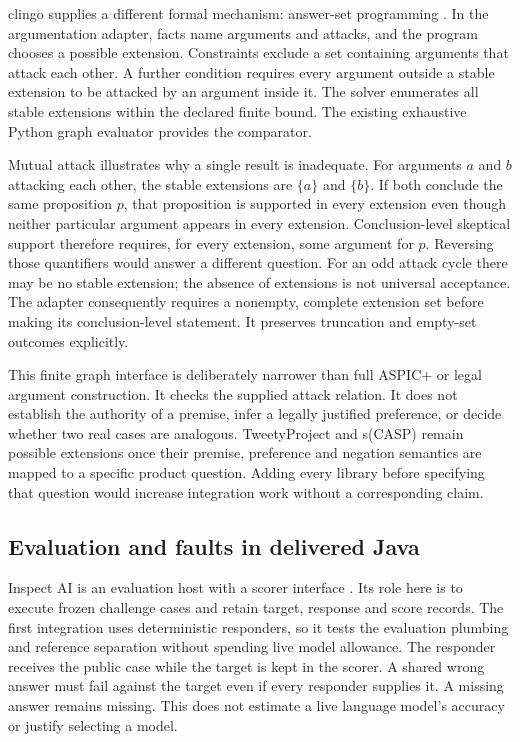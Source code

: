\documentclass[12pt,a4paper,oneside,openany]{book}
\begin{document}
clingo supplies a different formal mechanism: answer-set programming
\citep{clingosoftware}. In the argumentation adapter, facts name arguments and
attacks, and the program chooses a possible extension. Constraints exclude a set
containing arguments that attack each other. A further condition requires every
argument outside a stable extension to be attacked by an argument inside it.
The solver enumerates all stable extensions within the declared finite bound.
The existing exhaustive Python graph evaluator provides the comparator.

Mutual attack illustrates why a single result is inadequate. For arguments $a$
and $b$ attacking each other, the stable extensions are $\{a\}$ and $\{b\}$.
If both conclude the same proposition $p$, that proposition is supported in every
extension even though neither particular argument appears in every extension.
Conclusion-level skeptical support therefore requires, for every extension,
some argument for $p$. Reversing those quantifiers would answer a different
question. For an odd attack cycle there may be no stable extension; the absence
of extensions is not universal acceptance. The adapter consequently requires a
nonempty, complete extension set before making its conclusion-level statement.
It preserves truncation and empty-set outcomes explicitly.

This finite graph interface is deliberately narrower than full ASPIC+ or legal
argument construction. It checks the supplied attack relation. It does not
establish the authority of a premise, infer a legally justified preference, or
decide whether two real cases are analogous. TweetyProject and s(CASP) remain
possible extensions once their premise, preference and negation semantics are
mapped to a specific product question. Adding every library before specifying
that question would increase integration work without a corresponding claim.

\subsection{Evaluation and faults in delivered Java}

Inspect AI is an evaluation host with a scorer interface
\citep{inspectsoftware}. Its role here is to execute frozen challenge cases and
retain target, response and score records. The first integration uses deterministic
responders, so it tests the evaluation plumbing and reference separation without
spending live model allowance. The responder receives the public case while the
target is kept in the scorer. A shared wrong answer must fail against the target
even if every responder supplies it. A missing answer remains missing. This
does not estimate a live language model's accuracy or justify selecting a model.
\end{document}
